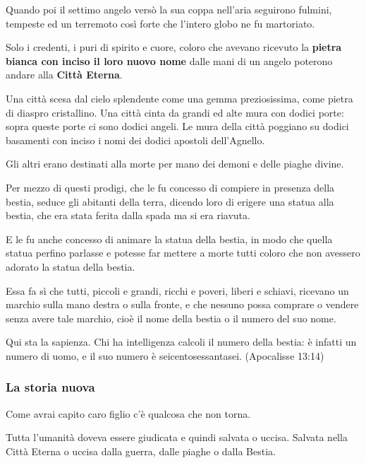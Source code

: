 \documentclass[12pt,a4paper,twoside,openany]{book}
\begin{document}
\begin{multicols}{2}
Quando poi il settimo angelo versò la sua coppa nell’aria seguirono fulmini, tempeste ed un terremoto così forte che l'intero globo ne fu martoriato.

Solo i credenti, i puri di spirito e cuore, coloro che avevano ricevuto la \textbf{pietra bianca con inciso il loro nuovo nome} dalle mani di un angelo poterono andare alla \textbf{Città Eterna}.

Una città scesa dal cielo splendente come una gemma preziosissima, come pietra di diaspro cristallino. Una città cinta da grandi ed alte mura con dodici porte: sopra queste porte ci sono dodici angeli.
Le mura della città poggiano su dodici basamenti con inciso i nomi dei dodici apostoli dell’Agnello.

Gli altri erano destinati alla morte per mano dei demoni e delle piaghe divine.


\begin{changemargin}{0.3cm}{0.3cm}\begin{enfasi}{
Per mezzo di questi prodigi, che le fu concesso di compiere in presenza della bestia, seduce gli abitanti della terra, dicendo loro di erigere una statua alla bestia, che era stata ferita dalla spada ma si era riavuta.

E le fu anche concesso di animare la statua della bestia, in modo che quella statua perfino parlasse e potesse far mettere a morte tutti coloro che non avessero adorato la statua della bestia.

Essa fa sì che tutti, piccoli e grandi, ricchi e poveri, liberi e schiavi, ricevano un marchio sulla mano destra o sulla fronte, e che nessuno possa comprare o vendere senza avere tale marchio, cioè il nome della bestia o il numero del suo nome.

Qui sta la sapienza. Chi ha intelligenza calcoli il numero della bestia: è infatti un numero di uomo, e il suo numero è seicentosessantasei. (Apocalisse 13:14)
}\end{enfasi}\end{changemargin}


\subsubsection{La storia nuova}

Come avrai capito caro figlio c'è qualcosa che non torna.

Tutta l'umanità doveva essere giudicata e quindi salvata o uccisa. Salvata nella Città Eterna o uccisa dalla guerra, dalle piaghe o dalla Bestia.


\end{multicols}
\end{document}
